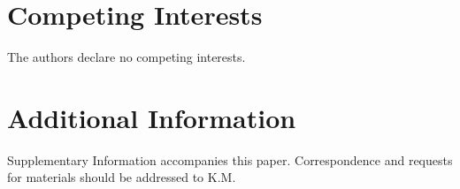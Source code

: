 \documentclass[fleqn,10pt]{article}
\begin{document}
\section*{Competing Interests}
The authors declare no competing interests.

\section*{Additional Information}
Supplementary Information accompanies this paper. Correspondence
and requests for materials should be addressed to K.M.
\end{document}
